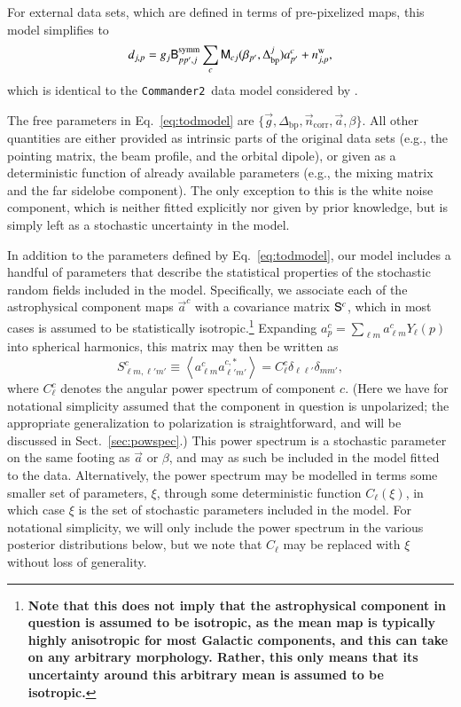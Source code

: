 \documentclass[twocolumn]{aa}
\def\commandertwo{\texttt{Commander2}}
\newcommand{\n}[0]{\vec{n}}
\renewcommand{\a}[0]{\vec{a}}
\newcommand{\B}[0]{\tens{B}}
\newcommand{\g}[0]{\vec{g}}
\newcommand{\M}[0]{\tens{M}}
\renewcommand{\S}[0]{\tens{S}}
\newcommand{\Dbp}[0]{\Delta_{\mathrm{bp}}}
\begin{document}
For external data sets, which are defined in terms of pre-pixelized
maps, this model simplifies to
\begin{equation}
  d_{j,p} = g_{j}\B^{\mathrm{symm}}_{pp',j}\sum_{c} \M_{cj}(\beta_{p'},
  \Dbp^{j})a^c_{p'} + n^{\mathrm{w}}_{j,p},
  \label{eq:pixmodel}
\end{equation}
which is identical to the \commandertwo\ data model considered by
\citet{seljebotn:2019}.

The free parameters in Eq.~\eqref{eq:todmodel} are
$\{\g,\Dbp,\n_{\mathrm{corr}}, \a, \beta\}$. All other
quantities are either provided as intrinsic parts of the original data
sets (e.g., the pointing matrix, the beam profile, and the orbital
dipole), or given as a deterministic function of already available
parameters (e.g., the mixing matrix and the far sidelobe
component). The only exception to this is the white noise component,
which is neither fitted explicitly nor given by prior knowledge, but
is simply left as a stochastic uncertainty in the model.

In addition to the parameters defined by Eq.~\eqref{eq:todmodel}, our
model includes a handful of parameters that describe the statistical
properties of the stochastic random fields included in the
model. Specifically, we associate each of the astrophysical component
maps $\a^c$ with a covariance matrix $\S^c$, which in most cases is
assumed to be statistically isotropic.\footnote{\bf Note that this
  does not imply that the astrophysical component in question is
  assumed to be isotropic, as the mean map is typically highly
  anisotropic for most Galactic components, and this can take on any
  arbitrary morphology. Rather, this only means that its uncertainty
  around this arbitrary mean is assumed to be isotropic.}  Expanding
$a^c_p = \sum_{\ell m} a^{c}_{\ell m} Y_{\ell}(p)$ into spherical
harmonics, this matrix may then be written as
\begin{equation}
S^{c}_{\ell m, \ell' m'} \equiv \left< a^{c}_{\ell m} a^{c,*}_{\ell' m'}\right> = C^{c}_{\ell} \delta_{\ell\ell'} \delta_{mm'},
\end{equation}
where $C^{c}_{\ell}$ denotes the angular power spectrum of component
$c$. (Here we have for notational simplicity assumed that the
component in question is unpolarized; the appropriate generalization
to polarization is straightforward, and will be discussed in Sect.~\ref{sec:powspec}.)
This power spectrum is a stochastic parameter on the same footing as
$\a$ or $\beta$, and may as such be included in the model fitted to
the data. Alternatively, the power spectrum may be modelled in terms
some smaller set of parameters, $\xi$, through some deterministic
function $C_{\ell}(\xi)$, in which case $\xi$ is the set of
stochastic parameters included in the model. For notational
simplicity, we will only include the power spectrum in the various
posterior distributions below, but we note that $C_\ell$ may be
replaced with $\xi$ without loss of generality.
\end{document}
